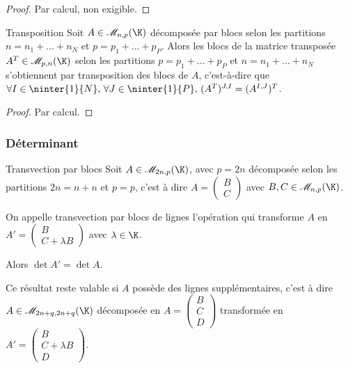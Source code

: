 \begin{proof}
    Par calcul, non exigible.
\end{proof}

\begin{proposition}{Transposition}{}
    Soit $A \in \mathscr M_{n, p}(\K)$ décomposée par blocs selon les partitions $n = n_1 + \dots + n_N$
    et $p = p_1 + \dots + p_P$. Alors les blocs de la matrice transposée $A^T \in \mathscr M_{p, n}(\K)$ selon 
    les partitions $p = p_1 + \dots + p_P$ et $n = n_1 + \dots + n_N$ s'obtiennent 
    par transposition des blocs de $A$, c'est-à-dire que
    $\forall I \in \ninter{1}{N}, \, \forall J \in \ninter{1}{P}, \, (A^T)^{J, I} = (A^{I, J})^T$.
\end{proposition}

\begin{proof}
    Par calcul.
\end{proof}

\subsubsection{Déterminant}

\begin{proposition}{Transvection par blocs}{}
    Soit $A \in \mathscr M_{2n, p}(\K)$, avec $p = 2n$
    décomposée selon les partitions $2n = n + n$ et $p = p$, 
    c'est à dire $A = \begin{pmatrix}
        B\\
        C
    \end{pmatrix}$ avec $B, C \in \mathscr M_{n, p}(\K)$.

    On appelle transvection par blocs de lignes l'opération qui transforme 
    $A$ en $A' = \begin{pmatrix}
        B  \\
        C + \lambda B
    \end{pmatrix}$ avec $\lambda \in \K$.

    Alors $\det A' = \det A$.
    
\end{proposition}

\begin{remarque}
    Ce résultat reste valable si $A$ possède des lignes supplémentaires, c'est à dire 
    $A \in \mathscr M_{2n + q, 2n + q}(\K)$ décomposée en 
    $A = \begin{pmatrix}
        B \\
        C \\
        D
        \end{pmatrix}$ transformée en $A' = \begin{pmatrix}
        B \\
        C + \lambda B \\
        D
    \end{pmatrix}$.
\end{remarque}

